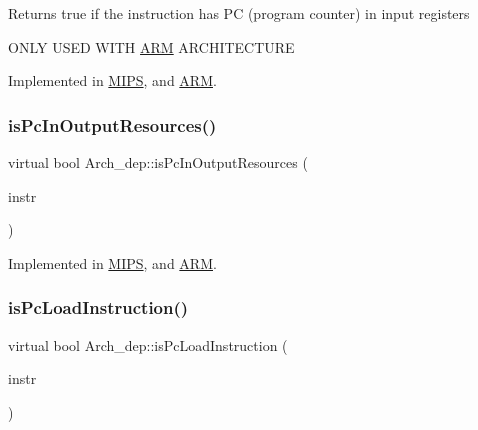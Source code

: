 Returns true if the instruction has PC (program counter) in input registers

O\+N\+LY U\+S\+ED W\+I\+TH \hyperlink{classARM}{A\+RM} A\+R\+C\+H\+I\+T\+E\+C\+T\+U\+RE 

Implemented in \hyperlink{classMIPS_affd67799c774ea1ca747f15d7a483a8c}{M\+I\+PS}, and \hyperlink{classARM_a3ead2b53ee35931a70471d265c5cc449}{A\+RM}.

\mbox{\label{classArch__dep_a89b89f3e5248442dda296986f5673bb6}} 
\subsubsection{\texorpdfstring{is\+Pc\+In\+Output\+Resources()}{isPcInOutputResources()}}
{\footnotesize\ttfamily virtual bool Arch\+\_\+dep\+::is\+Pc\+In\+Output\+Resources (\begin{DoxyParamCaption}\item[{const \hyperlink{classObjdumpInstruction}{Objdump\+Instruction} \&}]{instr }\end{DoxyParamCaption})\hspace{0.3cm}{\ttfamily [pure virtual]}}



Implemented in \hyperlink{classMIPS_a68497c5e46c6106133d4bf5a01db6e7d}{M\+I\+PS}, and \hyperlink{classARM_a664d4db9519b9a24f107cf3f23974453}{A\+RM}.

\mbox{\label{classArch__dep_aa96008928838f1ff0f96ba83b07b90e2}} 
\subsubsection{\texorpdfstring{is\+Pc\+Load\+Instruction()}{isPcLoadInstruction()}}
{\footnotesize\ttfamily virtual bool Arch\+\_\+dep\+::is\+Pc\+Load\+Instruction (\begin{DoxyParamCaption}\item[{string \&}]{instr }\end{DoxyParamCaption})\hspace{0.3cm}{\ttfamily [pure virtual]}}



